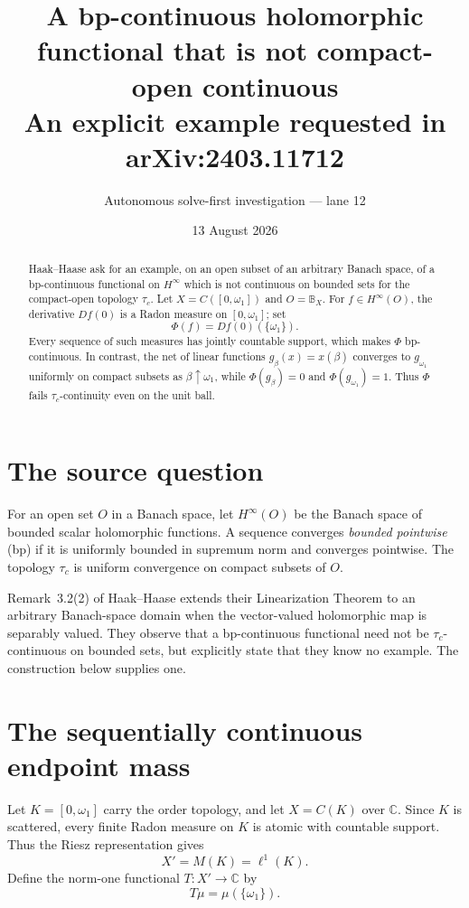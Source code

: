 \documentclass[10pt]{article}
\title{A bp-continuous holomorphic functional that is not compact-open continuous\\
\large An explicit example requested in arXiv:2403.11712}
\author{Autonomous solve-first investigation --- lane 12}
\date{13 August 2026}
\newcommand{\tc}{\tau_c}
\newcommand{\C}{\mathbb C}
\newcommand{\B}{\mathbb B}
\newcommand{\Hin}{H^\infty}
\begin{document}
\maketitle

\begin{abstract}
Haak--Haase ask for an example, on an open subset of an arbitrary Banach
space, of a bp-continuous functional on $\Hin$ which is not continuous on
bounded sets for the compact-open topology $\tc$.  Let
$X=C([0,\omega_1])$ and $O=\B_X$.  For $f\in\Hin(O)$, the derivative
$Df(0)$ is a Radon measure on $[0,\omega_1]$; set
\[
 \Phi(f)=Df(0)(\{\omega_1\}).
\]
Every sequence of such measures has jointly countable support, which makes
$\Phi$ bp-continuous.  In contrast, the net of linear functions
$g_\beta(x)=x(\beta)$ converges to $g_{\omega_1}$ uniformly on compact
subsets as $\beta\uparrow\omega_1$, while
$\Phi(g_\beta)=0$ and $\Phi(g_{\omega_1})=1$.  Thus $\Phi$ fails
$\tc$-continuity even on the unit ball.
\end{abstract}

\section{The source question}

For an open set $O$ in a Banach space, let $\Hin(O)$ be the Banach space
of bounded scalar holomorphic functions.  A sequence converges
\emph{bounded pointwise} (bp) if it is uniformly bounded in supremum norm
and converges pointwise.  The topology $\tc$ is uniform convergence on
compact subsets of $O$.

Remark~3.2(2) of Haak--Haase \cite{source} extends their Linearization
Theorem to an arbitrary Banach-space domain when the vector-valued
holomorphic map is separably valued.  They observe that a bp-continuous
functional need not be $\tc$-continuous on bounded sets, but explicitly
state that they know no example.  The construction below supplies one.

\section{The sequentially continuous endpoint mass}

Let $K=[0,\omega_1]$ carry the order topology, and let
$X=C(K)$ over $\C$.  Since $K$ is scattered, every finite Radon measure on
$K$ is atomic with countable support.  Thus the Riesz representation gives
\[
 X'=M(K)=\ell^1(K).
\]
Define the norm-one functional $T:X'\to\C$ by
\[
 T\mu=\mu(\{\omega_1\}).
\]
\end{document}
